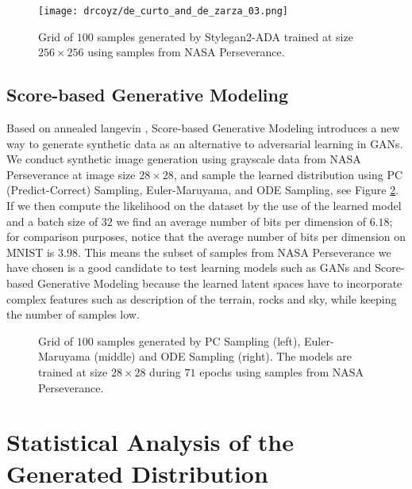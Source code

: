 \documentclass[lettersize,journal]{IEEEtran}
\begin{document}
\begin{figure}[ht]
\centering
\texttt{[image: drcoyz/de\_curto\_and\_de\_zarza\_03.png]}
\caption{Grid of $100$ samples generated by Stylegan2-ADA trained at size $256\times256$ using samples from NASA Perseverance.}
\label{fge:03_decurto_and_dezarza}
\end{figure}

\subsection{Score-based Generative Modeling}
Based on annealed langevin \cite{Song2019,Song2020}, Score-based Generative Modeling introduces a new way to generate synthetic data as an alternative to adversarial learning in GANs.
\\

We conduct synthetic image generation using grayscale data from NASA Perseverance at image size $28\times28$, and sample the learned distribution using PC (Predict-Correct) Sampling, Euler-Maruyama, and ODE Sampling, see Figure \ref{fge:17_decurto_and_dezarza}.
\\

If we then compute the likelihood on the dataset by the use of the learned model and a batch size of $32$ we find an average number of bits per dimension of $6.18$; for comparison purposes, notice that the average number of bits per dimension on MNIST is $3.98$. This means the subset of samples from NASA Perseverance we have chosen is a good candidate to test learning models such as GANs and Score-based Generative Modeling because the learned latent spaces have to incorporate complex features such as description of the terrain, rocks and sky, while keeping the number of samples low. 

\begin{figure}[ht]
\centering
{}
\caption{Grid of $100$ samples generated by PC Sampling (left), Euler-Maruyama (middle) and ODE Sampling (right). The models are trained at size $28\times28$ during $71$ epochs using samples from NASA Perseverance.}
\label{fge:17_decurto_and_dezarza}
\end{figure}

\section{Statistical Analysis of the Generated Distribution}
\label{sn:statistical_analysis}
\end{document}
